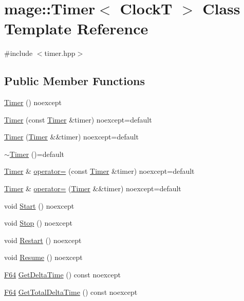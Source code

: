 \hypertarget{classmage_1_1_timer}{}\section{mage\+:\+:Timer$<$ ClockT $>$ Class Template Reference}
\label{classmage_1_1_timer}


{\ttfamily \#include $<$timer.\+hpp$>$}

\subsection*{Public Member Functions}
\begin{DoxyCompactItemize}
\item 
\hyperlink{classmage_1_1_timer_afdc4024388d57bbdda74854ee8a11683}{Timer} () noexcept
\item 
\hyperlink{classmage_1_1_timer_a69aa4becb39ab40f378bd110db8ceb84}{Timer} (const \hyperlink{classmage_1_1_timer}{Timer} \&timer) noexcept=default
\item 
\hyperlink{classmage_1_1_timer_a7fb565cbe34c04df2713c43d3341cbc4}{Timer} (\hyperlink{classmage_1_1_timer}{Timer} \&\&timer) noexcept=default
\item 
\hyperlink{classmage_1_1_timer_a2802ae35dfdc05ff57b49e82f9b504f2}{$\sim$\+Timer} ()=default
\item 
\hyperlink{classmage_1_1_timer}{Timer} \& \hyperlink{classmage_1_1_timer_a2a8aefb272e02d8ba4a26058df80f119}{operator=} (const \hyperlink{classmage_1_1_timer}{Timer} \&timer) noexcept=default
\item 
\hyperlink{classmage_1_1_timer}{Timer} \& \hyperlink{classmage_1_1_timer_a39654f81efccc38a4cbe6164659407dd}{operator=} (\hyperlink{classmage_1_1_timer}{Timer} \&\&timer) noexcept=default
\item 
void \hyperlink{classmage_1_1_timer_a633908e9e816e9397cd93b65bc11ddb3}{Start} () noexcept
\item 
void \hyperlink{classmage_1_1_timer_ab9442d64c2c1bedec830004f292725ab}{Stop} () noexcept
\item 
void \hyperlink{classmage_1_1_timer_a54dab2d77f8beca30d52e8497e466988}{Restart} () noexcept
\item 
void \hyperlink{classmage_1_1_timer_a8464b2ea3fb3d97eac5ccb3a5b02e47b}{Resume} () noexcept
\item 
\hyperlink{namespacemage_ad26233bbec640deda836e572c1a23708}{F64} \hyperlink{classmage_1_1_timer_ad4e320f1abe821aa1c9596c4d8b9c7e9}{Get\+Delta\+Time} () const noexcept
\item 
\hyperlink{namespacemage_ad26233bbec640deda836e572c1a23708}{F64} \hyperlink{classmage_1_1_timer_a4d67e33d559196d2d1ca1f75f12d5644}{Get\+Total\+Delta\+Time} () const noexcept
\end{DoxyCompactItemize}
